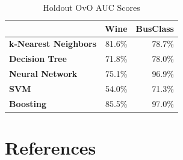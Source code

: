 \documentclass[
	letterpaper, %
]{jdf}
\begin{document}
\begin{table}
\centering
\caption{Holdout OvO AUC Scores}
\begin{tabular}{lrr}
\toprule
{} &  Wine &  BusClass \\
\midrule
\textbf{k-Nearest Neighbors} & 81.6\% &     78.7\% \\
\textbf{Decision Tree      } & 71.8\% &     78.0\% \\
\textbf{Neural Network     } & 75.1\% &     96.9\% \\
\textbf{SVM                } & 54.0\% &     71.3\% \\
\textbf{Boosting           } & 85.5\% &     97.0\% \\
\bottomrule
\end{tabular}
\end{table}

\section{References}
\printbibliography[heading=none]
\end{document}

